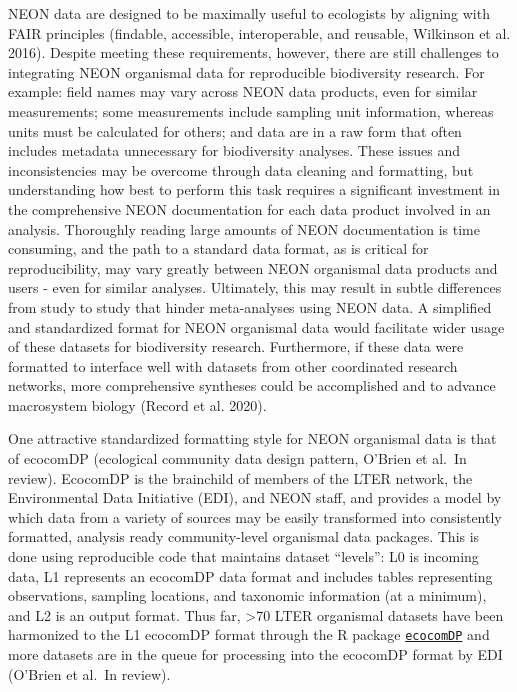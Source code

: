 \documentclass[
  12pt,
]{article}
\begin{document}
NEON data are designed to be maximally useful to ecologists by aligning with FAIR principles (findable, accessible, interoperable, and reusable, Wilkinson et al. 2016). Despite meeting these requirements, however, there are still challenges to integrating NEON organismal data for reproducible biodiversity research. For example: field names may vary across NEON data products, even for similar measurements; some measurements include sampling unit information, whereas units must be calculated for others; and data are in a raw form that often includes metadata unnecessary for biodiversity analyses. These issues and inconsistencies may be overcome through data cleaning and formatting, but understanding how best to perform this task requires a significant investment in the comprehensive NEON documentation for each data product involved in an analysis. Thoroughly reading large amounts of NEON documentation is time consuming, and the path to a standard data format, as is critical for reproducibility, may vary greatly between NEON organismal data products and users - even for similar analyses. Ultimately, this may result in subtle differences from study to study that hinder meta-analyses using NEON data. A simplified and standardized format for NEON organismal data would facilitate wider usage of these datasets for biodiversity research. Furthermore, if these data were formatted to interface well with datasets from other coordinated research networks, more comprehensive syntheses could be accomplished and to advance macrosystem biology (Record et al. 2020).

One attractive standardized formatting style for NEON organismal data is that of ecocomDP (ecological community data design pattern, O'Brien et al.~In review). EcocomDP is the brainchild of members of the LTER network, the Environmental Data Initiative (EDI), and NEON staff, and provides a model by which data from a variety of sources may be easily transformed into consistently formatted, analysis ready community-level organismal data packages. This is done using reproducible code that maintains dataset ``levels'': L0 is incoming data, L1 represents an ecocomDP data format and includes tables representing observations, sampling locations, and taxonomic information (at a minimum), and L2 is an output format. Thus far, \textgreater70 LTER organismal datasets have been harmonized to the L1 ecocomDP format through the R package \href{https://github.com/EDIorg/ecocomDP}{\texttt{ecocomDP}} and more datasets are in the queue for processing into the ecocomDP format by EDI (O'Brien et al.~In review).
\end{document}
